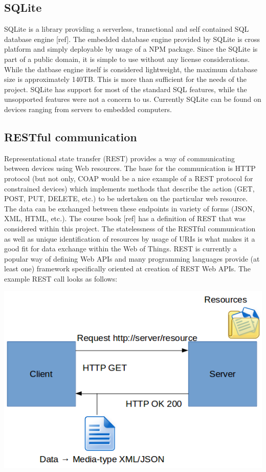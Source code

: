 \subsection{SQLite}
\label{subsec:sqlite}
SQLite is a library providing a serverless, transctional and self contained SQL database engine [ref]. The embedded database engine provided by SQLite is cross platform and simply deployable by usage of a NPM package. Since the SQLite is part of a public domain, it is simple to use without any license considerations. While the datbase engine itself is considered lightweight, the maximum database size is approximately 140TB. This is more than sufficient for the needs of the project. SQLite has support for most of the standard SQL features, while the unsopported features were not a concern to us. Currently SQLite can be found on devices ranging from servers to embedded computers.

\subsection{RESTful communication}
\label{subsec:rest}
Representational state transfer (REST) provides a way of communicating between devices using Web resources. The base for the communication is HTTP protocol (but not only, COAP would be a nice example of a REST protocol for constrained devices) which implements methods that describe the action (GET, POST, PUT, DELETE, etc.) to be udertaken on the particular web resource. The data can be exchanged between these endpoints in variety of forms (JSON, XML, HTML, etc.). The course book [ref] has a definition of REST that was considered within this project. The statelessness of the RESTful communication as well as unique identification of resources by usage of URIs is what makes it a good fit for data exchange within the Web of Things. REST is currently a popular way of defining Web APIs and many programming languages provide (at least one) framework specifically oriented at creation of REST Web APIs. The example REST call looks as follows:

\bigskip
\includegraphics[scale=0.5]{gfx/REST} 
\bigskip

